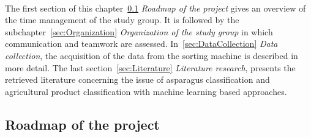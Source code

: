\\
The first section of this chapter~\ref{sec:Roadmap} \textit{Roadmap of the project} gives an overview of the time management of the study group. It is followed by the subchapter~\ref{sec:Organization} \textit{Organization of the study group} in which communication and teamwork are assessed. In~\ref{sec:DataCollection} \textit{Data collection}, the acquisition of the data from the sorting machine is described in more detail. The last section~\ref{sec:Literature} \textit{Literature research}, presents the retrieved literature concerning the issue of asparagus classification and agricultural product classification with machine learning based approaches.



\subsection{Roadmap of the project}
\label{sec:Roadmap}

